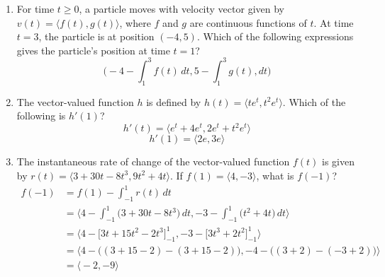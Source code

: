 \documentclass[12pt]{article}
\begin{document}
\begin{enumerate}
        \item For time $t \geq 0$, a particle moves with velocity vector given by $v(t)=\langle f(t),g(t)\rangle$, where $f$ and $g$ are continuous functions of $t$. At time $t=3$, the particle is at position $(-4,5)$. Which of the following expressions gives the particle's position at time $t=1$?
        $$\boxed{\biggr(-4-\int_{1}^{3} f(t) \, dt, 5- \int_{1}^{3} g(t) ,dt\biggr)}$$
        \item The vector-valued function $h$ is defined by $h(t)=\langle te^t,t^2e^t \rangle$. Which of the following is $h'(1)$?
        $$h'(t) = \langle e^t + 4e^t, 2e^t+t^2e^t\rangle$$
        $$\boxed{h'(1)= \langle 2e, 3e\rangle}$$
        \item The instantaneous rate of change of the vector-valued function $f(t)$ is given by $r(t)=\langle 3+30t-8t^3,9t^2+4t \rangle$. If $f(1)=\langle 4,-3 \rangle$, what is $f(-1)$?
        \begin{align*}
            f(-1) &= f(1)- \int_{-1}^{1} r(t) \, dt \\
            & = \biggr\langle 4-\int_{-1}^{1} \big(3+30t-8t^3\big) \, dt, -3 - \int_{-1}^{1} \big(t^2+4t\big)\, dt \biggr\rangle \\
            & = \biggr\langle 4-\big[3t+15t^2-2t^3\big]_{-1}^{1}, -3 - \big[3t^3+2t^2\big]_{-1}^{1} \biggr\rangle \\
            & = \biggr\langle 4-\big((3+15-2)-(3+15-2)\big), -4-\big((3+2)-(-3+2)\big) \biggr\rangle\\
            &= \boxed{\biggr\langle -2, -9\biggr\rangle}
        \end{align*}

    \end{enumerate}
\end{document}
